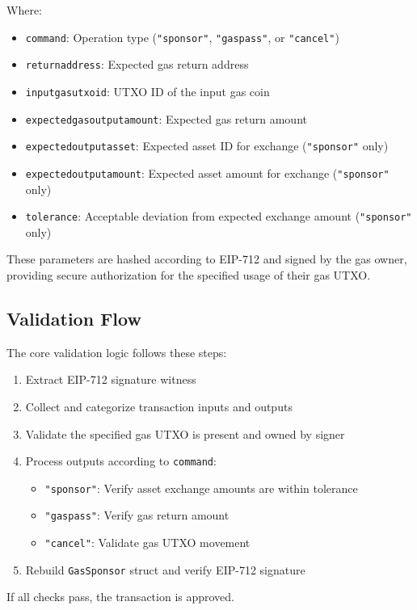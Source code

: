 Where:
\begin{itemize}
\item \texttt{command}: Operation type (\texttt{"sponsor"}, \texttt{"gaspass"}, or \texttt{"cancel"})
\item \texttt{returnaddress}: Expected gas return address
\item \texttt{inputgasutxoid}: UTXO ID of the input gas coin
\item \texttt{expectedgasoutputamount}: Expected gas return amount
\item \texttt{expectedoutputasset}: Expected asset ID for exchange (\texttt{"sponsor"} only)
\item \texttt{expectedoutputamount}: Expected asset amount for exchange (\texttt{"sponsor"} only)
\item \texttt{tolerance}: Acceptable deviation from expected exchange amount (\texttt{"sponsor"} only)
\end{itemize}

These parameters are hashed according to EIP-712 and signed by the gas owner, providing secure authorization for the
specified usage of their gas UTXO.\\


\subsection{Validation Flow}
The core validation logic follows these steps:

\begin{enumerate}
\item Extract EIP-712 signature witness
\item Collect and categorize transaction inputs and outputs
\item Validate the specified gas UTXO is present and owned by signer
\item Process outputs according to \texttt{command}:
\begin{itemize}
\item \texttt{"sponsor"}: Verify asset exchange amounts are within tolerance
\item \texttt{"gaspass"}: Verify gas return amount
\item \texttt{"cancel"}: Validate gas UTXO movement
\end{itemize}
\item Rebuild \texttt{GasSponsor} struct and verify EIP-712 signature
\end{enumerate}

If all checks pass, the transaction is approved.\\



